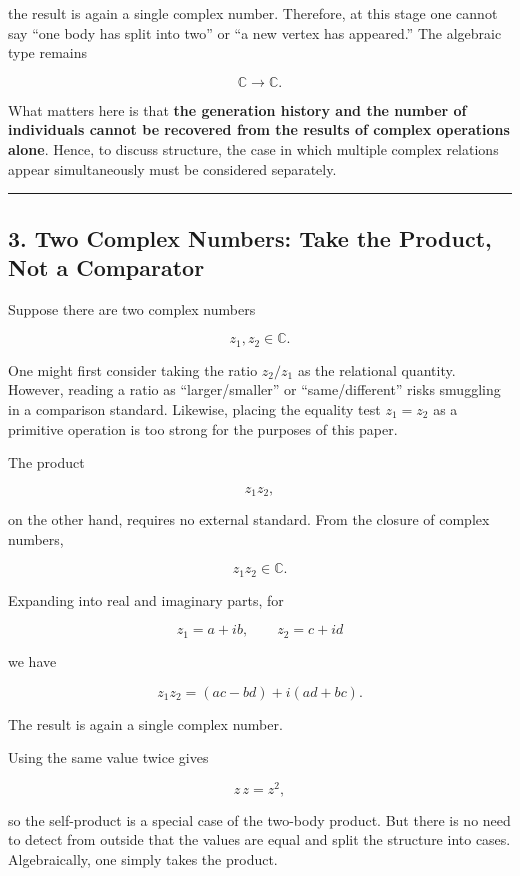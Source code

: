 \documentclass[
  a4paper,
]{article}
\begin{document}
the result is again a single complex number. Therefore, at this stage
one cannot say ``one body has split into two'' or ``a new vertex has
appeared.'' The algebraic type remains

\[
\mathbb C\to\mathbb C.
\]

What matters here is that \textbf{the generation history and the number
of individuals cannot be recovered from the results of complex
operations alone}. Hence, to discuss structure, the case in which
multiple complex relations appear simultaneously must be considered
separately.

\begin{center}\rule{0.5\linewidth}{0.5pt}\end{center}

\subsection{3. Two Complex Numbers: Take the Product, Not a
Comparator}\label{two-complex-numbers-take-the-product-not-a-comparator}

Suppose there are two complex numbers

\[
z_1,z_2\in\mathbb C.
\]

One might first consider taking the ratio \(z_2/z_1\) as the relational
quantity. However, reading a ratio as ``larger/smaller'' or
``same/different'' risks smuggling in a comparison standard. Likewise,
placing the equality test \(z_1=z_2\) as a primitive operation is too
strong for the purposes of this paper.

The product

\[
z_1z_2,
\]

on the other hand, requires no external standard. From the closure of
complex numbers,

\[
z_1z_2\in\mathbb C.
\]

Expanding into real and imaginary parts, for

\[
z_1=a+ib,\qquad z_2=c+id
\]

we have

\[
z_1z_2=(ac-bd)+i(ad+bc).
\]

The result is again a single complex number.

Using the same value twice gives

\[
z\,z=z^2,
\]

so the self-product is a special case of the two-body product. But there
is no need to detect from outside that the values are equal and split
the structure into cases. Algebraically, one simply takes the product.
\end{document}
